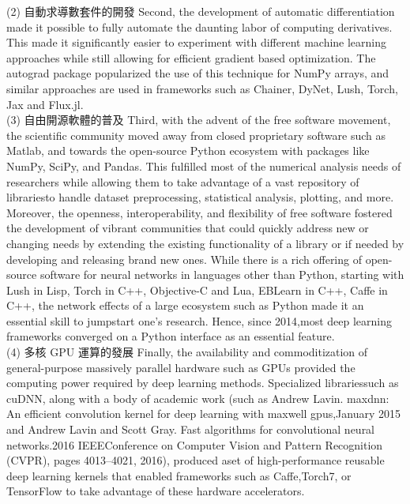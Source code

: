 \documentclass[12pt,a4paper]{article}
\begin{document}
(2) 自動求導數套件的開發 Second, the development of automatic differentiation made it possible to fully automate the daunting labor of computing derivatives. This made it significantly easier to experiment with different machine learning approaches while still allowing for efficient gradient based optimization. The autograd package popularized the use of this technique for NumPy arrays, and similar approaches are used in frameworks such as Chainer, DyNet, Lush, Torch, Jax and Flux.jl.\\

(3) 自由開源軟體的普及 Third, with the advent of the free software movement, the scientific community moved away from closed proprietary software such as Matlab, and towards the open-source Python ecosystem with packages like NumPy, SciPy, and Pandas. This fulfilled most of the numerical analysis needs of researchers while allowing them to take advantage of a vast repository of librariesto handle dataset preprocessing, statistical analysis, plotting, and more.\\
Moreover, the openness, interoperability, and flexibility of free software fostered the development of vibrant communities that could quickly address new or changing needs by extending the existing functionality of a library or if needed by developing and releasing brand new ones. While there is a rich offering of open-source software for neural networks in languages other than Python, starting with Lush in Lisp, Torch in C++, Objective-C and Lua, EBLearn in C++, Caffe in C++, the network effects of a large ecosystem such as Python made it an essential skill to jumpstart one’s research. Hence, since 2014,most deep learning frameworks converged on a Python interface as an essential feature.\\

(4) 多核 GPU 運算的發展 Finally, the availability and commoditization of general-purpose massively parallel hardware such as GPUs provided the computing power required by deep learning methods. Specialized librariessuch as cuDNN, along with a body of academic work (such as Andrew Lavin. maxdnn: An efficient convolution kernel for deep learning with maxwell gpus,January 2015 and Andrew Lavin and Scott Gray. Fast algorithms for convolutional neural networks.2016 IEEEConference on Computer Vision and Pattern Recognition (CVPR), pages 4013–4021, 2016), produced aset of high-performance reusable deep learning kernels that enabled frameworks such as Caffe,Torch7, or TensorFlow to take advantage of these hardware accelerators.\\
\end{document}
